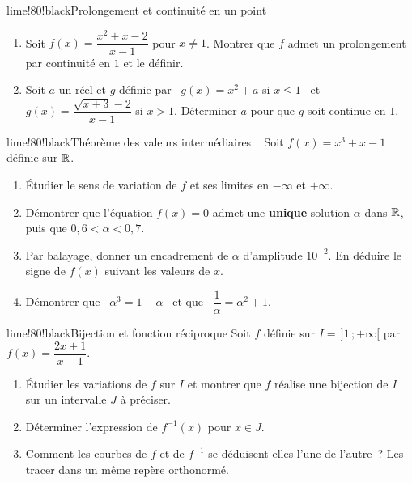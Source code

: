 
\begin{exo}{lime!80!black}{Prolongement et continuité en un point }
\begin{enumerate}
  \item Soit $f(x)=\dfrac{x^2+x-2}{x-1}$ pour $x\neq1$. Montrer que $f$ admet un prolongement par continuité en $1$ et le définir.
  \item Soit $a$ un réel et $g$ définie par \ $g(x)=x^2+a$ si $x\leq1$ \ et \ $g(x)=\dfrac{\sqrt{x+3}-2}{x-1}$ si $x>1$. Déterminer $a$ pour que $g$ soit continue en $1$.
\end{enumerate}
\end{exo}

\begin{exo}{lime!80!black}{Théorème des valeurs intermédiaires \demo\ }
Soit $f(x)=x^3+x-1$ définie sur $\mathbb{R}$.
\begin{enumerate}
  \item Étudier le sens de variation de $f$ et ses limites en $-\infty$ et $+\infty$.
  \item Démontrer que l'équation $f(x)=0$ admet une \textbf{unique} solution $\alpha$ dans $\mathbb{R}$, puis que $0{,}6<\alpha<0{,}7$.
  \item Par balayage, donner un encadrement de $\alpha$ d'amplitude $10^{-2}$. En déduire le signe de $f(x)$ suivant les valeurs de $x$.
  \item Démontrer que \ $\alpha^3=1-\alpha$ \ et que \ $\dfrac1\alpha=\alpha^2+1$.
\end{enumerate}
\end{exo}

\begin{exo}{lime!80!black}{Bijection et fonction réciproque }
Soit $f$ définie sur $I=\,]1\,;+\infty[$ par $f(x)=\dfrac{2x+1}{x-1}$.
\begin{enumerate}
  \item Étudier les variations de $f$ sur $I$ et montrer que $f$ réalise une bijection de $I$ sur un intervalle $J$ à préciser.
  \item Déterminer l'expression de $f^{-1}(x)$ pour $x\in J$.
  \item Comment les courbes de $f$ et de $f^{-1}$ se déduisent-elles l'une de l'autre~? Les tracer dans un même repère orthonormé.
\end{enumerate}
\end{exo}

